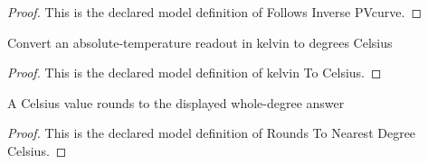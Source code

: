\begin{proof}
  This is the declared model definition of Follows Inverse PVcurve.
\end{proof}
\begin{definition}
  \label{def:physics:phyx-mini-0363:phyxminiproblems-problemphyxmini0363-kelvintocelsius}
  Convert an absolute-temperature readout in kelvin to degrees Celsius
\end{definition}
\begin{proof}
  This is the declared model definition of kelvin To Celsius.
\end{proof}
\begin{definition}
  \label{def:physics:phyx-mini-0363:phyxminiproblems-problemphyxmini0363-roundstonearestdegreecelsius}
  A Celsius value rounds to the displayed whole-degree answer
\end{definition}
\begin{proof}
  This is the declared model definition of Rounds To Nearest Degree Celsius.
\end{proof}
